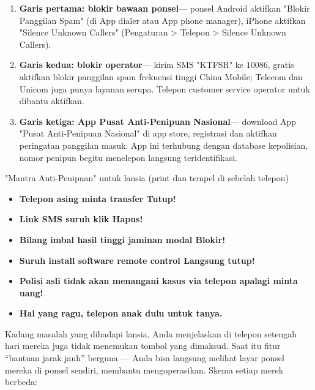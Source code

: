\begin{enumerate}
  \item \textbf{Garis pertama: blokir bawaan ponsel}— ponsel Android aktifkan "Blokir Panggilan Spam" (di App dialer atau App phone manager), iPhone aktifkan "Silence Unknown Callers" (Pengaturan > Telepon > Silence Unknown Callers).
  \item \textbf{Garis kedua: blokir operator}— kirim SMS "KTFSR" ke 10086, gratis aktifkan blokir panggilan spam frekuensi tinggi China Mobile; Telecom dan Unicom juga punya layanan serupa. Telepon customer service operator untuk dibantu aktifkan.
  \item \textbf{Garis ketiga: App Pusat Anti-Penipuan Nasional}— download App "Pusat Anti-Penipuan Nasional" di app store, registrasi dan aktifkan peringatan panggilan masuk. App ini terhubung dengan database kepolisian, nomor penipun begitu menelepon langsung teridentifikasi.
\end{enumerate}

\begin{tcbwarn}{"Mantra Anti-Penipuan" untuk lansia (print dan tempel di sebelah telepon)}
\begin{itemize}
  \item \textbf{Telepon asing minta transfer Tutup!}
  \item \textbf{Link SMS suruh klik Hapus!}
  \item \textbf{Bilang imbal hasil tinggi jaminan modal Blokir!}
  \item \textbf{Suruh install software remote control Langsung tutup!}
  \item \textbf{Polisi asli tidak akan menangani kasus via telepon apalagi minta uang!}
  \item \textbf{Hal yang ragu, telepon anak dulu untuk tanya.}
\end{itemize}

\end{tcbwarn}


Kadang masalah yang dihadapi lansia, Anda menjelaskan di telepon setengah hari mereka juga tidak menemukan tombol yang dimaksud. Saat itu fitur “bantuan jarak jauh” berguna — Anda bisa langsung melihat layar ponsel mereka di ponsel sendiri, membantu mengoperasikan. Skema setiap merek berbeda:

